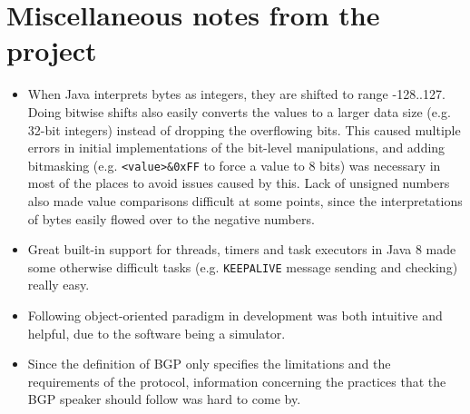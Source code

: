 \documentclass[11pt,a4paper,titlepage]{report}
\begin{document}
\section{Miscellaneous notes from the project}\label{sec:notes}
\begin{itemize}
\item When Java interprets bytes as integers, they are shifted to range -128..127. Doing bitwise shifts also easily converts the values to a larger data size (e.g. 32-bit integers) instead of dropping the overflowing bits. This caused multiple errors in initial implementations of the bit-level manipulations, and adding bitmasking (e.g. \texttt{<value>\&0xFF} to force a value to 8 bits) was necessary in most of the places to avoid issues caused by this. Lack of unsigned numbers also made value comparisons difficult at some points, since the interpretations of bytes easily flowed over to the negative numbers.
\item Great built-in support for threads, timers and task executors in Java 8 made some otherwise difficult tasks (e.g. \texttt{KEEPALIVE} message sending and checking) really easy.
\item Following object-oriented paradigm in development was both intuitive and helpful, due to the software being a simulator.
\item Since the definition of BGP \cite{RFC4271} only specifies the limitations and the requirements of the protocol, information concerning the practices that the BGP speaker should follow was hard to come by.
\end{itemize}



\end{document}

